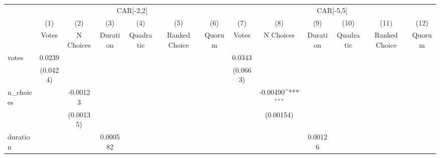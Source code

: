 {
\def\sym#1{\ifmmode^{#1}\else\(^{#1}\)\fi}
\begin{tabular}{l*{12}{c}}
\hline\hline
                    &\multicolumn{6}{c}{CAR[-2,2]}                                                                                                      &\multicolumn{6}{c}{CAR[-5,5]}                                                                                                      \\
                    &\multicolumn{1}{c}{(1)}&\multicolumn{1}{c}{(2)}&\multicolumn{1}{c}{(3)}&\multicolumn{1}{c}{(4)}&\multicolumn{1}{c}{(5)}&\multicolumn{1}{c}{(6)}&\multicolumn{1}{c}{(7)}&\multicolumn{1}{c}{(8)}&\multicolumn{1}{c}{(9)}&\multicolumn{1}{c}{(10)}&\multicolumn{1}{c}{(11)}&\multicolumn{1}{c}{(12)}\\
                    &\multicolumn{1}{c}{Votes}&\multicolumn{1}{c}{N Choices}&\multicolumn{1}{c}{Duration}&\multicolumn{1}{c}{Quadratic}&\multicolumn{1}{c}{Ranked Choice}&\multicolumn{1}{c}{Quorum}&\multicolumn{1}{c}{Votes}&\multicolumn{1}{c}{N Choices}&\multicolumn{1}{c}{Duration}&\multicolumn{1}{c}{Quadratic}&\multicolumn{1}{c}{Ranked Choice}&\multicolumn{1}{c}{Quorum}\\
\hline
votes               &      0.0239         &                     &                     &                     &                     &                     &      0.0343         &                     &                     &                     &                     &                     \\
                    &    (0.0424)         &                     &                     &                     &                     &                     &    (0.0663)         &                     &                     &                     &                     &                     \\
n\_choices           &                     &    -0.00123         &                     &                     &                     &                     &                     &    -0.00490\sym{***}&                     &                     &                     &                     \\
                    &                     &   (0.00135)         &                     &                     &                     &                     &                     &   (0.00154)         &                     &                     &                     &                     \\
duration            &                     &                     &    0.000582         &                     &                     &                     &                     &                     &     0.00126         &                     &                     &                     \\

\end{tabular}}
